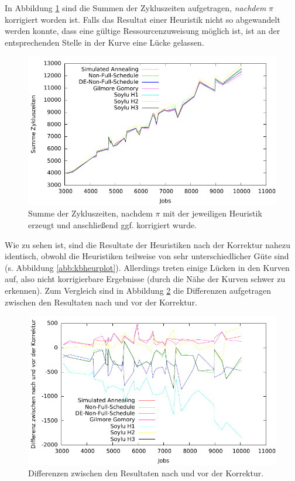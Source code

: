 \documentclass{scrreprt}
\begin{document}
In Abbildung \ref{abb:kbplot} sind die Summen der Zykluszeiten aufgetragen, \textit{nachdem} $\pi$ korrigiert worden ist.
Falls das Resultat einer Heuristik nicht so abgewandelt werden konnte, dass eine gültige Ressourcenzuweisung möglich ist, 
ist an der entsprechenden Stelle in der Kurve eine Lücke gelassen.
\begin{figure}
    \begin{center}
        \includegraphics[width=.8\textwidth]{../prog/heuristics/plots/kbplot.pdf}
    \end{center}
    \caption{
        \label{abb:kbplot}
        Summe der Zykluszeiten, nachdem $\pi$ mit der jeweiligen Heuristik erzeugt und anschließend ggf. korrigiert wurde.
    }
\end{figure}
Wie zu sehen ist, sind die Resultate der Heuristiken nach der Korrektur nahezu identisch, obwohl die Heuristiken teilweise von sehr unterschiedlicher Güte sind
(s. Abbildung \ref{abb:kbheurplot}).
Allerdings treten einige Lücken in den Kurven auf, also nicht korrigierbare Ergebnisse (durch die Nähe der Kurven schwer zu erkennen).
Zum Vergleich sind in Abbildung \ref{abb:kbdiffplot} die Differenzen aufgetragen zwischen den Resultaten nach und vor der Korrektur.
\begin{figure}
    \begin{center}
        \includegraphics[width=.8\textwidth]{../prog/heuristics/plots/kbdiffplot.pdf}
    \end{center}
    \caption{
        \label{abb:kbdiffplot}
        Differenzen zwischen den Resultaten nach und vor der Korrektur.
    }
\end{figure}
\end{document}
